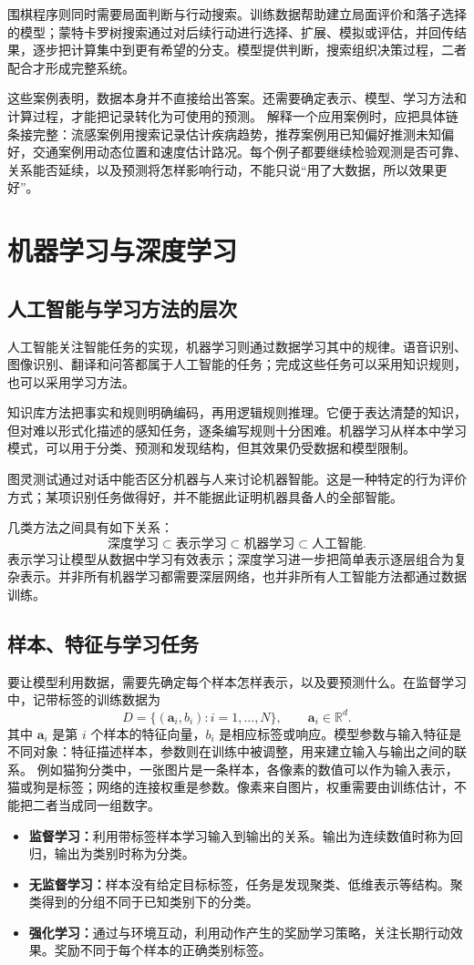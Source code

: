 \documentclass[UTF8,fontset=fandol,a4paper,12pt]{ctexart}
\newcommand{\R}{\mathbb R}
\newcommand{\va}{\boldsymbol a}
\theoremstyle{definition}
\begin{document}
围棋程序则同时需要局面判断与行动搜索。训练数据帮助建立局面评价和落子选择的模型；蒙特卡罗树搜索通过对后续行动进行选择、扩展、模拟或评估，并回传结果，逐步把计算集中到更有希望的分支。模型提供判断，搜索组织决策过程，二者配合才形成完整系统。

这些案例表明，数据本身并不直接给出答案。还需要确定表示、模型、学习方法和计算过程，才能把记录转化为可使用的预测。
解释一个应用案例时，应把具体链条接完整：流感案例用搜索记录估计疾病趋势，推荐案例用已知偏好推测未知偏好，交通案例用动态位置和速度估计路况。每个例子都要继续检验观测是否可靠、关系能否延续，以及预测将怎样影响行动，不能只说“用了大数据，所以效果更好”。

\section{机器学习与深度学习}\label{sec:ml}
\subsection{人工智能与学习方法的层次}
人工智能关注智能任务的实现，机器学习则通过数据学习其中的规律。语音识别、图像识别、翻译和问答都属于人工智能的任务；完成这些任务可以采用知识规则，也可以采用学习方法。

知识库方法把事实和规则明确编码，再用逻辑规则推理。它便于表达清楚的知识，但对难以形式化描述的感知任务，逐条编写规则十分困难。机器学习从样本中学习模式，可以用于分类、预测和发现结构，但其效果仍受数据和模型限制。

图灵测试通过对话中能否区分机器与人来讨论机器智能。这是一种特定的行为评价方式；某项识别任务做得好，并不能据此证明机器具备人的全部智能。

几类方法之间具有如下关系：
\[
 \text{深度学习}\subset\text{表示学习}\subset\text{机器学习}\subset\text{人工智能}.
\]
表示学习让模型从数据中学习有效表示；深度学习进一步把简单表示逐层组合为复杂表示。并非所有机器学习都需要深层网络，也并非所有人工智能方法都通过数据训练。

\subsection{样本、特征与学习任务}
要让模型利用数据，需要先确定每个样本怎样表示，以及要预测什么。在监督学习中，记带标签的训练数据为
\[
 D=\{(\va_i,b_i):i=1,\ldots,N\},\qquad \va_i\in\R^d.
\]
其中 $\va_i$ 是第 $i$ 个样本的特征向量，$b_i$ 是相应标签或响应。模型参数与输入特征是不同对象：特征描述样本，参数则在训练中被调整，用来建立输入与输出之间的联系。
例如猫狗分类中，一张图片是一条样本，各像素的数值可以作为输入表示，猫或狗是标签；网络的连接权重是参数。像素来自图片，权重需要由训练估计，不能把二者当成同一组数字。
\begin{itemize}
\item \textbf{监督学习：}利用带标签样本学习输入到输出的关系。输出为连续数值时称为回归，输出为类别时称为分类。
\item \textbf{无监督学习：}样本没有给定目标标签，任务是发现聚类、低维表示等结构。聚类得到的分组不同于已知类别下的分类。
\item \textbf{强化学习：}通过与环境互动，利用动作产生的奖励学习策略，关注长期行动效果。奖励不同于每个样本的正确类别标签。
\end{itemize}
\end{document}

